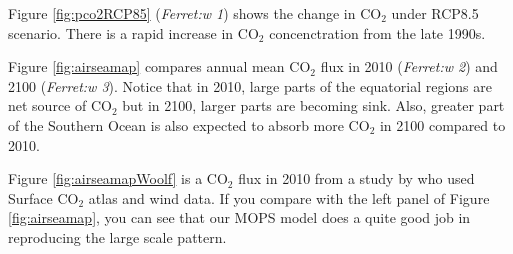 \documentclass[a4paper]{article}
\def\CO{$\mathrm{CO_{2}}$ }
\begin{document}
\begin{enumerate}
Figure \ref{fig:pco2RCP85} (\emph{Ferret:w 1}) shows the change in $\mathrm{CO_2}$ under RCP8.5 scenario. There is a rapid increase in \CO concenctration from the late 1990s. 

Figure \ref{fig:airseamap} compares annual mean $\mathrm{CO_2}$ flux in 2010 (\emph{Ferret:w 2}) and 2100 (\emph{Ferret:w 3}). Notice that in 2010, large parts of the equatorial regions are net source of $\mathrm{CO_2}$ but in 2100, larger parts are becoming sink. Also, greater part of the Southern Ocean is also expected to absorb more  $\mathrm{CO_2}$ in 2100 compared to 2010. 

Figure \ref{fig:airseamapWoolf} is a $\mathrm{CO_2}$ flux in 2010 from a study by \cite{Woolf19} who used Surface $\mathrm{CO_2}$ atlas and wind data. If you compare with the left panel of Figure  \ref{fig:airseamap}, you can see that our MOPS model does a quite good job in reproducing the large scale pattern.


\end{enumerate}
\end{document}
